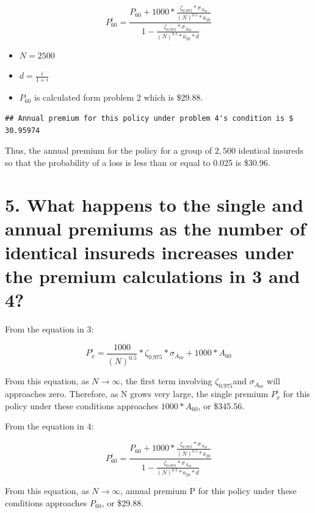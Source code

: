 \documentclass[
]{article}
\begin{document}
\[
P^{\epsilon}_{60} = \frac{P_{60} + 1000*\frac{\zeta_{0.975}*\sigma_{A_{60}}}{(N)^{0.5}*\ddot{a}_{{20}}}}{1-\frac{\zeta_{0.975}*\sigma_{A_{60}}}{(N)^{0.5}*\ddot{a}_{{20}}*d}}
\]

\begin{itemize}
\item
  \(N = 2500\)
\item
  \(d = \frac{i}{1+i}\)
\item
  \(P_{60}\) is calculated form problem 2 which is \$29.88.
\end{itemize}

\begin{verbatim}
## Annual premium for this policy under problem 4's condition is $ 30.95974
\end{verbatim}

Thus, the annual premium for the policy for a group of \(2,500\)
identical insureds so that the probability of a loss is less than or
equal to 0.025 is \$30.96.

\hypertarget{what-happens-to-the-single-and-annual-premiums-as-the-number-of-identical-insureds-increases-under-the-premium-calculations-in-3-and-4}{%
\section{5. What happens to the single and annual premiums as the number
of identical insureds increases under the premium calculations in 3 and
4?}\label{what-happens-to-the-single-and-annual-premiums-as-the-number-of-identical-insureds-increases-under-the-premium-calculations-in-3-and-4}}

From the equation in 3:

\[
P^{\epsilon}_x= \frac{1000}{(N)^{0.5}}*\zeta_{0.975}*\sigma_{A_{60}} + 1000*A_{60}
\]

From this equation, as \(N \to \infty\), the first term involving
\(\zeta_{0.975}\)and \(\sigma_{A_{60}}\) will approaches zero.
Therefore, as N grows very large, the single premium \(P^{\epsilon}_x\)
for this policy under these conditions approaches \(1000*A_{60}\), or
\$345.56.

From the equation in 4:

\[
P^{\epsilon}_{60} = \frac{P_{60} + 1000*\frac{\zeta_{0.975}*\sigma_{A_{60}}}{(N)^{0.5}*\ddot{a}_{{20}}}}{1-\frac{\zeta_{0.975}*\sigma_{A_{60}}}{(N)^{0.5}*\ddot{a}_{{20}}*d}}
\]

From this equation, as \(N \to \infty\), annual premium P for this
policy under these conditions approaches \(P_{60}\), or \$29.88.
\end{document}
